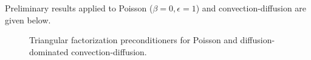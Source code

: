 \documentclass{article}
\begin{document}
Preliminary results applied to Poisson ($\beta = 0, \epsilon = 1$) and convection-diffusion are given below.  
\begin{figure}
\centering
{}
\caption{Triangular factorization preconditioners for Poisson and diffusion-dominated convection-diffusion.}
\end{figure}
\end{document}
